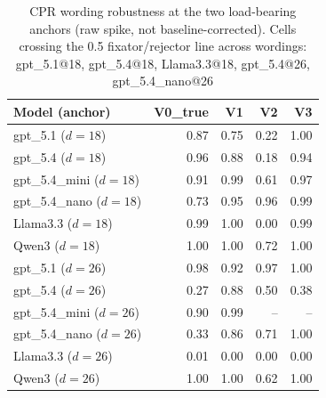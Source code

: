 \begin{table}[t]
\centering
\caption{CPR wording robustness at the two load-bearing anchors (raw spike, not baseline-corrected). Cells crossing the 0.5 fixator/rejector line across wordings: gpt_5.1@18, gpt_5.4@18, Llama3.3@18, gpt_5.4@26, gpt_5.4_nano@26}
\label{tab:wording_robustness}
\small
\begin{tabular}{lrrrr}
\toprule
Model (anchor) & V0\_true & V1 & V2 & V3 \\
\midrule
gpt\_5.1 ($d{=}18$) & 0.87 & 0.75 & 0.22 & 1.00 \\
gpt\_5.4 ($d{=}18$) & 0.96 & 0.88 & 0.18 & 0.94 \\
gpt\_5.4\_mini ($d{=}18$) & 0.91 & 0.99 & 0.61 & 0.97 \\
gpt\_5.4\_nano ($d{=}18$) & 0.73 & 0.95 & 0.96 & 0.99 \\
Llama3.3 ($d{=}18$) & 0.99 & 1.00 & 0.00 & 0.99 \\
Qwen3 ($d{=}18$) & 1.00 & 1.00 & 0.72 & 1.00 \\
gpt\_5.1 ($d{=}26$) & 0.98 & 0.92 & 0.97 & 1.00 \\
gpt\_5.4 ($d{=}26$) & 0.27 & 0.88 & 0.50 & 0.38 \\
gpt\_5.4\_mini ($d{=}26$) & 0.90 & 0.99 & -- & -- \\
gpt\_5.4\_nano ($d{=}26$) & 0.33 & 0.86 & 0.71 & 1.00 \\
Llama3.3 ($d{=}26$) & 0.01 & 0.00 & 0.00 & 0.00 \\
Qwen3 ($d{=}26$) & 1.00 & 1.00 & 0.62 & 1.00 \\
\bottomrule
\end{tabular}
\end{table}
